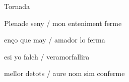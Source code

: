 \documentclass[12pt]{article}
\begin{document}
\begin{estrofaExtra}%




\begin{tornada}

Tornada

\end{tornada}


\end{estrofaExtra}


\begin{estrofa}

 Plenade seny / mon enteniment ferme

 en\c{c}o que may / amador lo ferma

 esi yo falch / veramorfallira

 mellor detots / aure nom sim conferme

\end{estrofa}
\end{document}
